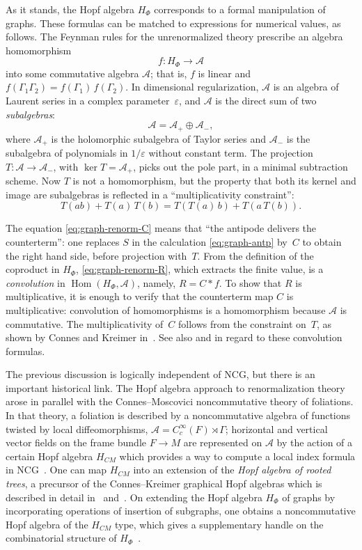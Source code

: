 \documentclass[a4paper,12pt]{article}
\newcommand{\A}{\mathcal{A}}        %
\newcommand{\Coo}{C^\infty}         %
\newcommand{\eps}{\varepsilon}      %
\newcommand{\Ga}{\Gamma}            %
\DeclareMathOperator{\Hom}{Hom}     %
\newcommand{\1}{\mathbf{1}}         %
\newcommand{\7}{\dagger}            %
\newcommand{\8}{\bullet}            %
\renewcommand{\.}{\cdot}            %
\renewcommand{\:}{\colon}           %
\begin{document}
As it stands, the Hopf algebra $H_\Phi$ corresponds to a formal
manipulation of graphs. These formulas can be matched to expressions
for numerical values, as follows. The Feynman rules for the
unrenormalized theory prescribe an algebra homomorphism
$$
f : H_\Phi \to \A
$$
into some commutative algebra $\A$; that is, $f$ is linear and
$f(\Ga_1 \Ga_2) = f(\Ga_1)\,f(\Ga_2)$. In dimensional regularization,
$\A$ is an algebra of Laurent series in a complex parameter~$\eps$,
and $\A$ is the direct sum of two \textit{subalgebras}:
$$
\A = \A_+ \oplus \A_-,
$$
where $\A_+$ is the holomorphic subalgebra of Taylor series and $\A_-$
is the subalgebra of polynomials in $1/\eps$ without constant term.
The projection $T\: \A \to \A_-$, with $\ker T = \A_+$, picks out the
pole part, in a minimal subtraction scheme. Now $T$ is not a
homomorphism, but the property that both its kernel and image are
subalgebras is reflected in a ``multiplicativity constraint'':
$$
T(ab) + T(a)\,T(b) = T(T(a)\,b) + T(a\,T(b)).
$$

The equation \eqref{eq:graph-renorm-C} means that ``the antipode
delivers the counterterm'': one replaces $S$ in the calculation
\eqref{eq:graph-antp} by~$C$ to obtain the right hand side, before
projection with~$T$. From the definition of the coproduct in $H_\Phi$,
\eqref{eq:graph-renorm-R}, which extracts the finite value, is a
\textit{convolution} in $\Hom(H_\Phi,\A)$, namely, $R = C * f$. To
show that $R$ is multiplicative, it is enough to verify that the
counterterm map $C$ is multiplicative: convolution of homomorphisms is
a homomorphism because $\A$ is commutative. The multiplicativity
of~$C$ follows from the constraint on~$T$, as shown by Connes and
Kreimer in~\cite{ConnesKrRHI}. See also \cite{Calypso} and
\cite{GirelliMK} in regard to these convolution formulas.

The previous discussion is logically independent of NCG, but there is
an important historical link. The Hopf algebra approach to
renormalization theory arose in parallel with the Connes--Moscovici
noncommutative theory of foliations. In that theory, a foliation is
described by a noncommutative algebra of functions twisted by local
diffeomorphisms, $\A = \Coo_c(F) \rtimes \Ga$; horizontal and vertical
vector fields on the frame bundle $F \to M$ are represented on $\A$ by
the action of a certain Hopf algebra $H_{CM}$ which provides a way to
compute a local index formula in NCG~\cite{ConnesMHopf}. One can map
$H_{CM}$ into an extension of the \textit{Hopf algebra of rooted
trees}, a precursor of the Connes--Kreimer graphical Hopf algebras
which is described in detail in~\cite{ConnesKrHopf}
and~\cite{Polaris}. On extending the Hopf algebra $H_\Phi$ of graphs
by incorporating operations of insertion of subgraphs, one obtains a
noncommutative Hopf algebra of the $H_{CM}$ type, which gives a
supplementary handle on the combinatorial structure of
$H_\Phi$~\cite{ConnesKrLie}.
\end{document}
